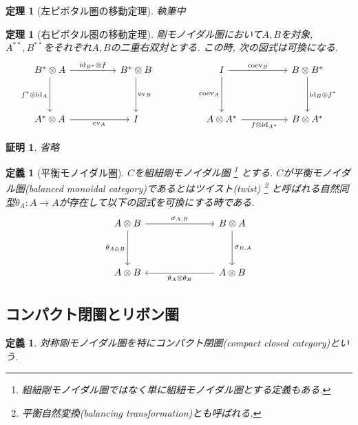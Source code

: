\documentclass[a4paper,12pt]{ltjsarticle}
\theoremstyle{break}
\newtheorem{defn}[thm]{定義}
\newtheorem{thrm}[thm]{定理}
\newtheorem*{prf}{証明}
\newcommand{\id}{\mathrm{id}}
\newcommand{\eva}{\mathrm{ev}}
\newcommand{\coev}{\mathrm{coev}}
\newcommand{\si}{\sigma}
\newcommand{\ot}{\otimes}
\numberwithin{equation}{section}
\begin{document}
\begin{thrm}[左ピボタル圏の移動定理]
  執筆中
\end{thrm}

\begin{thrm}[右ピボタル圏の移動定理]
  剛モノイダル圏において$A,B$を対象, $A^{**},B^{**}$をそれぞれ$A,B$の二重右双対とする. 
  この時, 次の図式は可換になる. 
  \[\begin{tikzcd}
    {B^* \ot A} && {B^* \ot B} && I && {B \ot B^*} \\
    \\
    {A^* \ot A} && I && {A \ot A^*} && {B \ot A^*}
    \arrow["{\id_{B^*} \ot f}", from=1-1, to=1-3]
    \arrow["{f^* \ot \id_A}"', from=1-1, to=3-1]
    \arrow["{\eva_A}"', from=3-1, to=3-3]
    \arrow["{\eva_B}", from=1-3, to=3-3]
    \arrow["{\coev_B}", from=1-5, to=1-7]
    \arrow["{\coev_A}"', from=1-5, to=3-5]
    \arrow["{f \ot \id_{A^*}}"', from=3-5, to=3-7]
    \arrow["{\id_B \ot f^*}", from=1-7, to=3-7]
  \end{tikzcd}\]
\end{thrm}

\begin{prf}
  省略
\end{prf}

\begin{defn}[平衡モノイダル圏]
  $C$を組紐剛モノイダル圏
  \footnote{
    組紐剛モノイダル圏ではなく単に組紐モノイダル圏とする定義もある. 
  } 
  とする. 
  $C$が平衡モノイダル圏(balanced monoidal category)であるとはツイスト(twist)
  \footnote{
    平衡自然変換(balancing transformation)とも呼ばれる. 
  }
  と呼ばれる自然同型$\theta_A: A \to A$が存在して以下の図式を可換にする時である. 
  \[\begin{tikzcd}
    {A \ot B} &&& {B \ot A} \\
    \\
    {A \ot B} &&& {A \ot B}
    \arrow["{\si_{A,B}}", from=1-1, to=1-4]
    \arrow["{\si_{B,A}}", from=1-4, to=3-4]
    \arrow["{\theta_A \ot \theta_B}", from=3-4, to=3-1]
    \arrow["{\theta_{A \ot B}}"', from=1-1, to=3-1]
  \end{tikzcd}\]
\end{defn}

\subsection{コンパクト閉圏とリボン圏}

\begin{defn}
  対称剛モノイダル圏を特にコンパクト閉圏(compact closed category)という. 
\end{defn}
\end{document}
